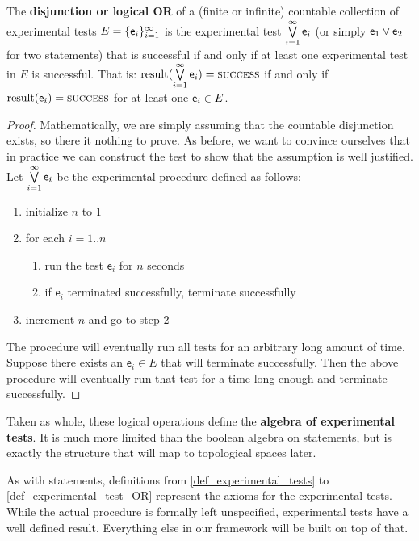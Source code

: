 \documentclass[11pt,letterpaper,fleqn]{memoir} %
\begin{document}
\begin{mathSection}
	\begin{defn}\label{def_experimental_test_OR}
	The \textbf{disjunction or logical OR} of a (finite or infinite) countable collection of experimental tests $E=\{\mathsf{e}_i\}_{i=1}^{\infty}$ is the experimental test $\bigvee\limits_{i=1}^{\infty} \mathsf{e}_i$ (or simply $\mathsf{e}_1 \vee \mathsf{e}_2$ for two statements) that is successful if and only if at least one experimental test in $E$ is successful. That is: $\operatorname{result}(\bigvee\limits_{i=1}^{\infty} \mathsf{e}_i) = \textsc{success}$ if and only if $\operatorname{result}(\mathsf{e}_i) = \textsc{success}$ for at least one $\mathsf{e}_i \in E$.
	\end{defn}
	\begin{proof}
		Mathematically, we are simply assuming that the countable disjunction exists, so there it nothing to prove. As before, we want to convince ourselves that in practice we can construct the test to show that the assumption is well justified.
		Let $\bigvee\limits_{i=1}^{\infty} \mathsf{e}_i$ be the experimental procedure defined as follows:
		\begin{enumerate}
			\item initialize $n$ to 1
			\item for each $i=1..n$
			\begin{enumerate}
				\item run the test $\mathsf{e}_i$ for $n$ seconds
				\item if $\mathsf{e}_i$ terminated successfully, terminate successfully
			\end{enumerate}
			\item increment $n$ and go to step 2
		\end{enumerate}
		The procedure will eventually run all tests for an arbitrary long amount of time. Suppose there exists an $\mathsf{e}_i \in E$ that will terminate successfully. Then the above procedure will eventually run that test for a time long enough and terminate successfully.
	\end{proof}
\end{mathSection}

Taken as whole, these logical operations define the \textbf{algebra of experimental tests}. It is much more limited than the boolean algebra on statements, but is exactly the structure that will map to topological spaces later.

As with statements, definitions from \ref{def_experimental_tests} to \ref{def_experimental_test_OR} represent the axioms for the experimental tests. While the actual procedure is formally left unspecified, experimental tests have a well defined result. Everything else in our framework will be built on top of that.
\end{document}
